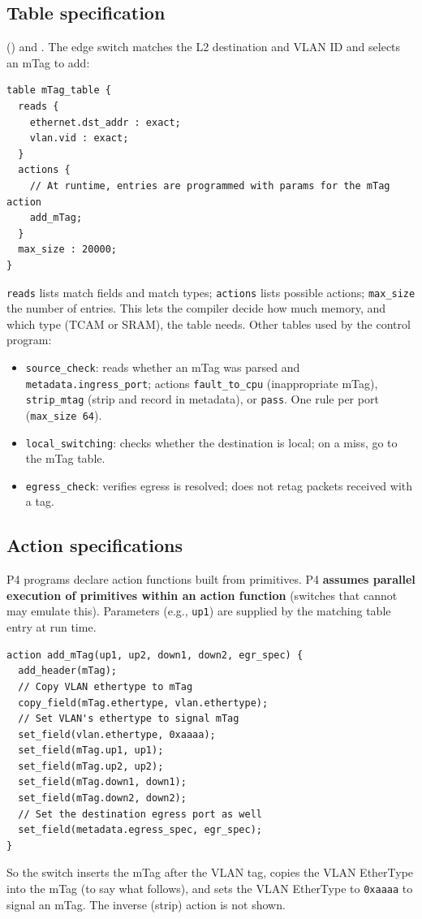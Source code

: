 \subsection{Table specification}
 () and . The edge switch matches the L2 destination and VLAN ID and selects an mTag to add:
\begin{lstlisting}
table mTag_table {
  reads {
    ethernet.dst_addr : exact;
    vlan.vid : exact;
  }
  actions {
    // At runtime, entries are programmed with params for the mTag action
    add_mTag;
  }
  max_size : 20000;
}
\end{lstlisting}
\texttt{reads} lists match fields and match types; \texttt{actions} lists possible actions; \texttt{max\_size} the number of entries. This lets the compiler decide how much memory, and which type (TCAM or SRAM), the table needs. Other tables used by the control program:
\begin{itemize}
\item \texttt{source\_check}: reads whether an mTag was parsed and \texttt{metadata.ingress\_port}; actions \texttt{fault\_to\_cpu} (inappropriate mTag), \texttt{strip\_mtag} (strip and record in metadata), or \texttt{pass}. One rule per port (\texttt{max\_size 64}).
\item \texttt{local\_switching}: checks whether the destination is local; on a miss, go to the mTag table.
\item \texttt{egress\_check}: verifies egress is resolved; does not retag packets received with a tag.
\end{itemize}

\subsection{Action specifications}
P4 programs declare action functions built from primitives. P4 \textbf{assumes parallel execution of primitives within an action function} (switches that cannot may emulate this). Parameters (e.g., \texttt{up1}) are supplied by the matching table entry at run time.
\begin{lstlisting}
action add_mTag(up1, up2, down1, down2, egr_spec) {
  add_header(mTag);
  // Copy VLAN ethertype to mTag
  copy_field(mTag.ethertype, vlan.ethertype);
  // Set VLAN's ethertype to signal mTag
  set_field(vlan.ethertype, 0xaaaa);
  set_field(mTag.up1, up1);
  set_field(mTag.up2, up2);
  set_field(mTag.down1, down1);
  set_field(mTag.down2, down2);
  // Set the destination egress port as well
  set_field(metadata.egress_spec, egr_spec);
}
\end{lstlisting}
So the switch inserts the mTag after the VLAN tag, copies the VLAN EtherType into the mTag (to say what follows), and sets the VLAN EtherType to \texttt{0xaaaa} to signal an mTag. The inverse (strip) action is not shown.

